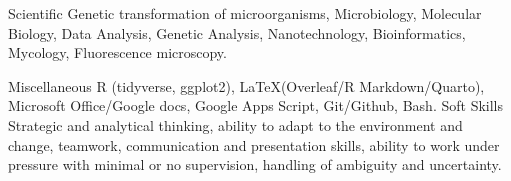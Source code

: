 

\begin{cvskills}

  \cvskill
    {Scientific} %
    {Genetic transformation of microorganisms, Microbiology, Molecular Biology, Data Analysis, Genetic Analysis, Nanotechnology, Bioinformatics, Mycology, Fluorescence microscopy.} %

  \cvskill
    {Miscellaneous} %
    {R (tidyverse, ggplot2), \textrm{\large \LaTeX}(Overleaf/R Markdown/Quarto), Microsoft Office/Google docs, Google Apps Script, Git/Github, Bash.} %
  \cvskill
    {Soft Skills} %
    {Strategic and analytical thinking, ability to adapt to the environment and change, teamwork, communication and presentation skills, ability to work under pressure with minimal or no supervision, handling of ambiguity and uncertainty.} %

\end{cvskills}

